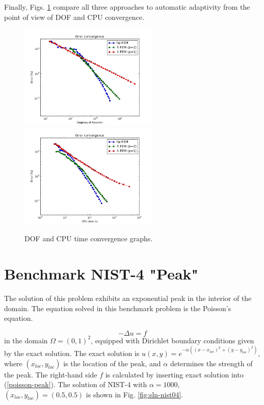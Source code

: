\documentclass[12pt]{elsarticle}
\begin{document}
Finally, Figs. \ref{fig:nist-3-conv} compare all
three approaches to automatic adaptivity from the point
of view of DOF and CPU convergence.

\begin{figure}[!ht]
\centering
\includegraphics[height=5cm]{nist/nist-3/conv_dof_aniso.png}\ \
\includegraphics[height=5cm]{nist/nist-3/conv_cpu_aniso.png}
\caption{DOF and CPU time convergence graphs.}
\label{fig:nist-3-conv}
\end{figure}


\section{Benchmark NIST-4 "Peak"}
\label{sec:bench-4}

The solution of this problem exhibits an exponential peak in the interior of the domain.
The equation solved in this benchmark problem is the Poisson's equation.

\begin{equation} \label{poisson-peak}
-\Delta u = f
\end{equation}
in the domain $\Omega = (0, 1)^2$, equipped with Dirichlet
boundary conditions given by the exact solution.
The exact solution is
$u(x,y) = e^{-\alpha ((x - x_{loc})^{2} + (y - y_{loc})^{2})}$,
where $(x_{loc}, y_{loc})$ is the location of the peak,
and $\alpha$ determines the strength of the peak.
The right-hand side $f$ is calculated by inserting exact solution into (\ref{poisson-peak}).
The solution of NIST-4 with $\alpha = 1000$,
$(x_{loc}, y_{loc}) = (0.5, 0.5)$ is shown in Fig. \ref{fig:sln-nist04}.
\end{document}

